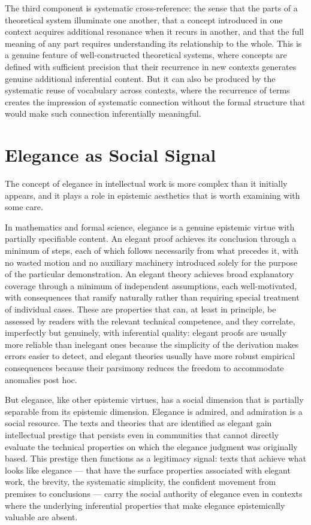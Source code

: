 \documentclass[12pt, openright, twoside]{book}
\begin{document}
The third component is systematic cross-reference: the sense that the
parts of a theoretical system illuminate one another, that a concept
introduced in one context acquires additional resonance when it recurs
in another, and that the full meaning of any part requires understanding
its relationship to the whole. This is a genuine feature of well-constructed
theoretical systems, where concepts are defined with sufficient precision
that their recurrence in new contexts generates genuine additional
inferential content. But it can also be produced by the systematic
reuse of vocabulary across contexts, where the recurrence of terms
creates the impression of systematic connection without the formal
structure that would make such connection inferentially meaningful.

\section{Elegance as Social Signal}

The concept of elegance in intellectual work is more complex than it
initially appears, and it plays a role in epistemic aesthetics that
is worth examining with some care.

In mathematics and formal science, elegance is a genuine epistemic
virtue with partially specifiable content. An elegant proof achieves
its conclusion through a minimum of steps, each of which follows
necessarily from what precedes it, with no wasted motion and no
auxiliary machinery introduced solely for the purpose of the particular
demonstration. An elegant theory achieves broad explanatory coverage
through a minimum of independent assumptions, each well-motivated,
with consequences that ramify naturally rather than requiring special
treatment of individual cases. These are properties that can, at least
in principle, be assessed by readers with the relevant technical
competence, and they correlate, imperfectly but genuinely, with
inferential quality: elegant proofs are usually more reliable than
inelegant ones because the simplicity of the derivation makes errors
easier to detect, and elegant theories usually have more robust
empirical consequences because their parsimony reduces the freedom
to accommodate anomalies post hoc.

But elegance, like other epistemic virtues, has a social dimension
that is partially separable from its epistemic dimension. Elegance
is admired, and admiration is a social resource. The texts and theories
that are identified as elegant gain intellectual prestige that persists
even in communities that cannot directly evaluate the technical
properties on which the elegance judgment was originally based.
This prestige then functions as a legitimacy signal: texts that
achieve what looks like elegance --- that have the surface properties
associated with elegant work, the brevity, the systematic simplicity,
the confident movement from premises to conclusions --- carry the
social authority of elegance even in contexts where the underlying
inferential properties that make elegance epistemically valuable
are absent.
\end{document}
